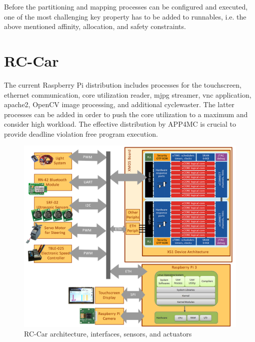 \documentclass [a4paper,final,conference,10pt]{IDAACS}
\begin{document}
Before the partitioning and mapping processes can be configured and executed, one of the most challenging key property has to be added to runnables, i.e. the above mentioned affinity, allocation, and safety constraints.
\section{RC-Car}
\label{sec:rccar}
The current Raspberry Pi distribution includes processes for the touchscreen, ethernet communication, core utilization reader, mjpg streamer, vnc application, apache2, OpenCV\cite{opencv} image processing, and additional cyclewaster. The latter processes can be added in order to push the core utilization to a maximum and consider high workload. The effective distribution by APP4MC is crucial to provide deadline violation free program execution. 
\begin{figure}[h!]
	\centering
	\includegraphics[scale=0.1]{images/hwarch.png}
	\caption{\label{fig:arch}RC-Car architecture, interfaces, sensors, and actuators}
\end{figure}
\end{document}
